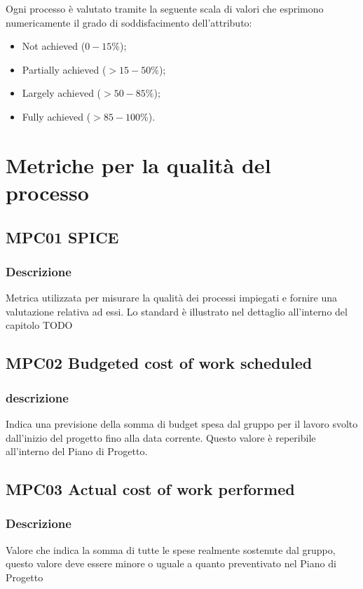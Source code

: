 \documentclass[a4paper]{article}
\begin{document}
Ogni processo è valutato tramite la seguente scala di valori che esprimono numericamente il grado di soddisfacimento dell’attributo:
\begin{itemize}
  \item Not achieved (\(0-15\%\));
  \item Partially achieved (\(>15-50\%\));
  \item Largely achieved (\(>50-85\%\));
  \item Fully achieved (\(>85-100\%\)). 
\end{itemize}



\section{Metriche per la qualità del processo}

\subsection{MPC01 SPICE}
\subsubsection{Descrizione}
Metrica utilizzata per misurare la qualità dei processi impiegati e fornire una valutazione relativa ad essi. Lo standard è illustrato nel dettaglio all’interno del capitolo TODO

\subsection{MPC02 Budgeted cost of work scheduled}
\subsubsection{descrizione}
Indica una previsione della somma di budget spesa dal gruppo per il lavoro svolto dall’inizio del progetto fino alla data corrente. Questo valore è reperibile all’interno del Piano di Progetto.

\subsection{MPC03 Actual cost of work performed}
\subsubsection{Descrizione}
Valore che indica la somma di tutte le spese realmente sostenute dal gruppo, questo valore deve essere minore o uguale a quanto preventivato nel Piano di Progetto
\end{document}
